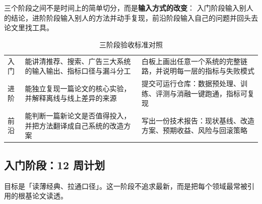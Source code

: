 三个阶段之间不是时间上的简单切分，而是\textbf{输入方式的改变}：
入门阶段输入别人的结论，进阶阶段输入别人的方法并动手复现，前沿阶段输入自己的问题并回头去论文里找工具。

\begin{table}[htbp]
\centering
\caption{三阶段验收标准对照}
\label{tab:stage-criteria}
\small
\begin{tabularx}{\textwidth}{L{1.8cm} L{3.4cm} Y}
\toprule
{} &  &  \\
\midrule
入门 & 能讲清推荐、搜索、广告三大系统的输入输出、指标口径与漏斗分工 &
白板上画出任意一个系统的完整链路，并说明每一层的指标与失败模式 \\
\midrule
进阶 & 能独立复现一篇论文的核心实验，并解释离线与线上差异的来源 &
提交可运行仓库：数据预处理、训练、评测与消融一键跑通，指标可复现 \\
\midrule
前沿 & 能判断一篇新论文是否值得投入，并把方法翻译成自己系统的改造方案 &
写出一份技术报告：现状基线、改造方案、预期收益、风险与回滚策略 \\
\bottomrule
\end{tabularx}
\end{table}

\subsection{入门阶段：12 周计划}

目标是「读薄经典、拉通口径」。这一阶段不追求最新，而是把每个领域最常被引用的根基论文读透。

